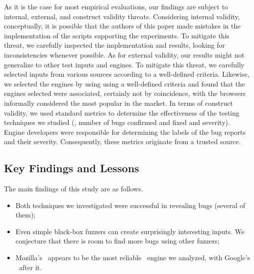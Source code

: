 \documentclass[smallextended]{svjour3}
\begin{document}
As it is the case for most empirical evaluations, our findings are
subject to internal, external, and construct validity
threats. Considering internal validity, conceptually, it is possible
that the authors of this paper made mistakes in the implementation of
the scripts supporting the experiments. To mitigate this threat, we
carefully inspected the implementation and results, looking for
inconsistencies whenever possible. As for external validity, our
results might not generalize to other test inputs and engines. To
mitigate this threat, we carefully selected inputs from various
sources according to a well-defined criteria. Likewise, we selected
the engines by using using a well-defined criteria and found that the
engines selected were associated, certainly not by coincidence, with
the browsers informally considered the most popular in the market. In
terms of construct validity, we used standard metrics to determine the
effectiveness of the testing techniques we studied (\eg{}, number of
bugs confirmed and fixed and severity). Engine developers were
responsible for determining the labels of the bug reports and their
severity. Consequently, these metrics originate from a trusted source.


\subsection{Key Findings and Lessons}
\label{sec:lessons}

The main findings of this study are as follows.

\begin{itemize}
  \item Both techniques we investigated were successful in revealing
    bugs (several of them);
  \item Even simple black-box fuzzers can create surprisingly
    interesting inputs. We conjecture that there is room to find more
    bugs using other fuzzers;
  \item Mozilla's \smonkey\ appears to be the most reliable
    \js\ engine we analyzed, with Google's \veight\ after it.
\end{itemize}
\end{document}
